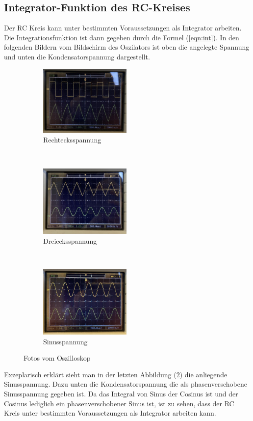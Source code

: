 \subsection{Integrator-Funktion des RC-Kreises}
    Der RC Kreis kann unter bestimmten Voraussetzungen als Integrator arbeiten. Die Integrationsfunktion ist dann gegeben durch die Formel (\ref{eqn:int}). In den folgenden Bildern vom
    Bildschirm des Oszilators ist oben die angelegte Spannung und unten die Kondensatorspannung dargestellt.

    \begin{figure}[H]
	\centering
	\begin{subfigure}[b]{0.3\textwidth}
		\centering
		\includegraphics[width=4.5cm]{Rechteck.jpg}
		\caption{Rechtecksspannung}
	\end{subfigure}
	~
	\begin{subfigure}[b]{0.3\textwidth}
		\centering
		\includegraphics[width=4.5cm]{Dreieck.jpg}
		\caption{Dreiecksspannung}
	\end{subfigure}
	~
	\begin{subfigure}[b]{0.3\textwidth}
		\centering
		\includegraphics[width=4.5cm]{Sinus.jpg}
		\caption{Sinusspannung}
        \label{fig:sinus}
	\end{subfigure}
    \caption{Fotos vom Oszilloskop}
\end{figure}

\noindent
    Exzeplarisch erklärt sieht man in der letzten Abbildung (\ref{fig:sinus}) die anliegende Sinusspannung. Dazu unten die Kondensatorspannung die als phasenverschobene Sinusspannung gegeben ist.
    Da das Integral von Sinus der Cosinus ist und der Cosinus lediglich ein phasenverschobener Sinus ist, ist zu sehen, dass der RC Kreis unter bestimmten Voraussetzungen als Integrator arbeiten kann.

